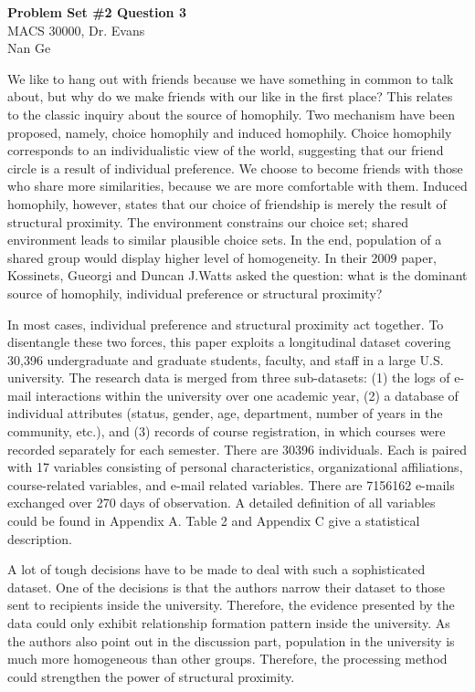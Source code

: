 \documentclass[letterpaper,12pt]{article}
\theoremstyle{definition}
\begin{document}
\begin{flushleft}
  \textbf{\large{Problem Set \#2 Question 3}} \\
  MACS 30000, Dr. Evans \\
  Nan Ge
\end{flushleft}

\vspace{5mm}

We like to hang out with friends because we have something in common to talk about, but why do we make friends with our like in the first place? This relates to the classic inquiry about the source of homophily. Two mechanism have been proposed, namely, choice homophily and induced homophily. Choice homophily corresponds to an individualistic view of the world, suggesting that our friend circle is a result of individual preference. We choose to become friends with those who share more similarities, because we are more comfortable with them. Induced homophily, however, states that our choice of friendship is merely the result of structural proximity. The environment constrains our choice set; shared environment leads to similar plausible choice sets. In the end, population of a shared group would display higher level of homogeneity. In their 2009 paper, Kossinets, Gueorgi and Duncan J.Watts asked the question: what is the dominant source of homophily, individual preference or structural proximity?

In most cases, individual preference and structural proximity act together. To disentangle these two forces, this paper exploits a longitudinal dataset covering 30,396 undergraduate and graduate students, faculty, and staff in a large U.S. university. The research data is merged from three sub-datasets: (1) the logs of e-mail interactions within the university over one academic year, (2) a database of individual attributes (status, gender, age, department, number of years in the community, etc.), and (3) records of course registration, in which courses were recorded separately for each semester. There are 30396 individuals. Each is paired with 17 variables consisting of personal characteristics, organizational affiliations, course-related variables, and e-mail related variables. There are 7156162 e-mails exchanged over 270 days of observation. A detailed definition of all variables could be found in Appendix A. Table 2 and Appendix C give a statistical description.

A lot of tough decisions have to be made to deal with such a sophisticated dataset. One of the decisions is that the authors narrow their dataset to those sent to recipients inside the university. Therefore, the evidence presented by the data could only exhibit relationship formation pattern inside the university. As the authors also point out in the discussion part, population in the university is much more homogeneous than other groups. Therefore, the processing method could strengthen the power of structural proximity.
\end{document}
